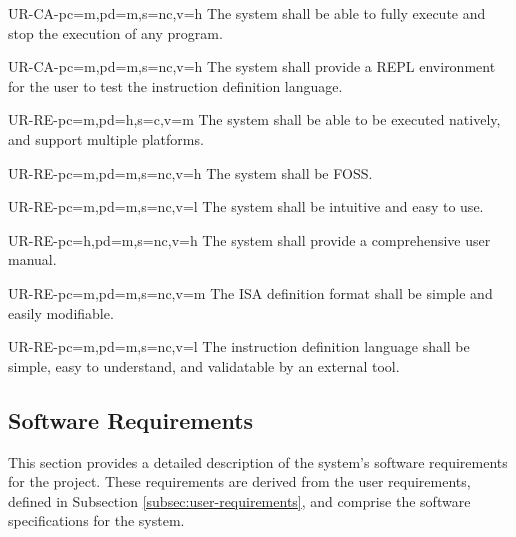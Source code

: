 \begin{userReq}{UR-CA-}{pc=m,pd=m,s=nc,v=h}
  The system shall be able to fully execute and stop the execution of any program.
\end{userReq}

\begin{userReq}{UR-CA-}{pc=m,pd=m,s=nc,v=h}
  The system shall provide a \gls{REPL environment} for the user to test the instruction definition language.
\end{userReq}


\setcounter{i}{1}

\begin{userReq}{UR-RE-}{pc=m,pd=h,s=c,v=m}
  The system shall be able to be executed natively, and support multiple platforms.
\end{userReq}

\begin{userReq}{UR-RE-}{pc=m,pd=m,s=nc,v=h}
  The system shall be \gls{FOSS}.
\end{userReq}

\begin{userReq}{UR-RE-}{pc=m,pd=m,s=nc,v=l}
  The system shall be intuitive and easy to use.
\end{userReq}

\begin{userReq}{UR-RE-}{pc=h,pd=m,s=nc,v=h}
  The system shall provide a comprehensive user manual.
\end{userReq}

\begin{userReq}{UR-RE-}{pc=m,pd=m,s=nc,v=m}
  The \gls{ISA} definition format shall be simple and easily modifiable.
\end{userReq}

\begin{userReq}{UR-RE-}{pc=m,pd=m,s=nc,v=l}
  The instruction definition language shall be simple, easy to understand, and  validatable by an external tool.
\end{userReq}


\FloatBarrier  %


\subsection{Software Requirements}\label{subsec:soft-requirements}
This section provides a detailed description of the system's software requirements for the project. These requirements are derived from the user requirements, defined in Subsection \ref{subsec:user-requirements}, and comprise the software specifications for the system.

